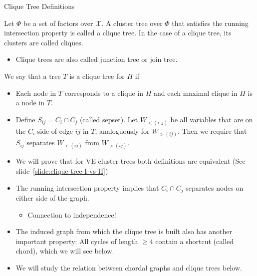 \begin{frame}{Clique Tree Definitions}
    \begin{definition}
        \label{def:clique-tree-I}
    Let $\Phi$ be a set of factors over $\mathcal{X}$.
    A cluster tree over $\Phi$ that satisfies the running intersection property is called a clique tree.
    In the case of a clique tree, its clusters are called cliques.
    \end{definition}
\pause
\begin{itemize}
    \item Clique trees are also called junction tree or join tree.
\end{itemize}
\pause
    \begin{definition}
        \label{def:clique-tree-II}
        We say that a tree $T$ is a clique tree for $H$ if
        \begin{itemize}
            \item Each node in $T$ corresponds to a clique in $H$ and each maximal clique in $H$ is a node in $T$.
            \pause \item Define $S_{ij} = C_i \cap C_j$ (called sepset). 
            Let $W_{<(i,j)}$ be all variables that are on the $C_i$ side of edge $ij$ in $T$, analoguously for $W_{>(ij)}$.
            Then we require that $S_{ij}$ separates $W_{<(ij)}$ from $W_{>(ij)}$.
        \end{itemize}
    \end{definition}
    \begin{itemize}
        \pause \item We will prove that for VE cluster trees both definitions are equivalent (See slide~\ref{slide:clique-tree-I-vs-II})
        \pause \item The running intersection property implies that $C_i \cap C_j$ separates nodes on either side of the graph.
        \begin{itemize}
            \pause \item Connection to independence!
        \end{itemize}
        \pause \item The induced graph from which the clique tree is built also has another important property: All cycles of length $\geq 4$ contain a shortcut (called chord), which we will see below.
        \pause \item We will study the relation between chordal graphs and clique trees below.
    \end{itemize}
\end{frame}

